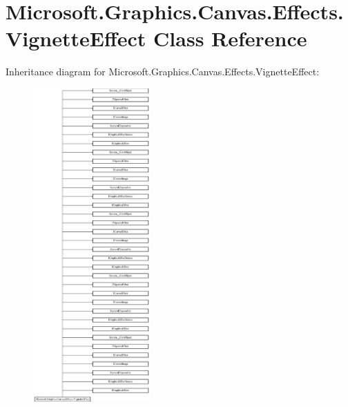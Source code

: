 \hypertarget{class_microsoft_1_1_graphics_1_1_canvas_1_1_effects_1_1_vignette_effect}{}\section{Microsoft.\+Graphics.\+Canvas.\+Effects.\+Vignette\+Effect Class Reference}
\label{class_microsoft_1_1_graphics_1_1_canvas_1_1_effects_1_1_vignette_effect}
Inheritance diagram for Microsoft.\+Graphics.\+Canvas.\+Effects.\+Vignette\+Effect\+:\begin{figure}[H]
\begin{center}
\leavevmode
\includegraphics[height=12.000000cm]{class_microsoft_1_1_graphics_1_1_canvas_1_1_effects_1_1_vignette_effect}
\end{center}
\end{figure}
